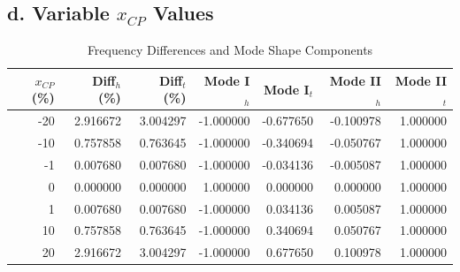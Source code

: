 \documentclass{article}
\begin{document}
\subsection{d. Variable $x_{CP}$ Values}

\begin{table}[H]
\centering
\caption{MATLAB Parametric Analysis Results}
\end{table}

\begin{table}[H]
\centering
\caption{Frequency Differences and Mode Shape Components}
\begin{tabular}{@{}rrrrrrr@{}}
\toprule
$x_{CP}$ (\%) & Diff$_h$ (\%) & Diff$_t$ (\%) & Mode I$_h$ & Mode I$_t$ & Mode II$_h$ & Mode II$_t$ \\
\midrule
-20 & 2.916672 & 3.004297 & -1.000000 & -0.677650 & -0.100978 & 1.000000 \\
-10 & 0.757858 & 0.763645 & -1.000000 & -0.340694 & -0.050767 & 1.000000 \\
-1  & 0.007680 & 0.007680 & -1.000000 & -0.034136 & -0.005087 & 1.000000 \\
0   & 0.000000 & 0.000000 & 1.000000  & 0.000000  & 0.000000  & 1.000000 \\
1   & 0.007680 & 0.007680 & -1.000000 & 0.034136  & 0.005087  & 1.000000 \\
10  & 0.757858 & 0.763645 & -1.000000 & 0.340694  & 0.050767  & 1.000000 \\
20  & 2.916672 & 3.004297 & -1.000000 & 0.677650  & 0.100978  & 1.000000 \\
\bottomrule
\end{tabular}
\end{table}
\end{document}
